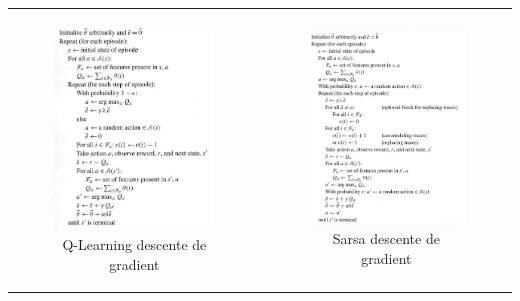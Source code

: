 \documentclass[a4paper,12pt]{article}
\begin{document}
              \begin{center}
	\begin{tabular}{cc}
	  \hspace*{-1cm}
	  \begin{minipage}[b]{.52\linewidth}
	    \begin{figure}[H]
	      \includegraphics[width=270px]{QLearning_Gradient}
	      \caption{ Q-Learning descente de gradient  }
	    \end{figure}
	  \end{minipage}
	  &
	  \begin{minipage}[b]{.5\linewidth}
	    \begin{figure}[H]
	      \includegraphics[width=270px]{Sarsa_Gradient}
	      \caption{ Sarsa descente de gradient  }
	    \end{figure}
	  \end{minipage}
	\end{tabular}
      \end{center} 
      
\end{document}
